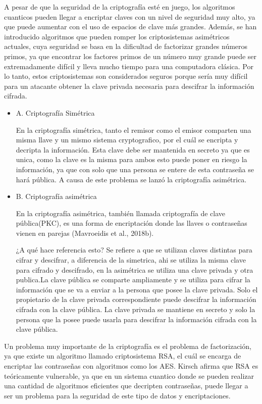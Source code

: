 \documentclass{article}
\begin{document}
A pesar de que la seguridad de la criptografía esté en juego, los algoritmos cuanticos pueden llegar a encriptar claves con un nivel de seguridad muy alto, ya que puede aumentar con el uso de espacios de clave más grandes. Además, se han introducido algoritmos que pueden romper los criptosistemas asimétricos actuales, cuya seguridad se basa en la dificultad de factorizar grandes números primos, ya que encontrar los factores primos de un número muy grande puede ser extremadamente difícil y lleva mucho tiempo para una computadora clásica. Por lo tanto, estos criptosistemas son considerados seguros porque sería muy difícil para un atacante obtener la clave privada necesaria para descifrar la información cifrada.

\begin{itemize}
    \item{A}. Criptografía Simétrica

        En la criptografía simétrica, tanto el remisor como el emisor comparten una misma llave y un mismo sistema cryptografico, por el cuál se encripta y decripta la información. Esta clave debe ser mantenida en secreto ya que es unica, como la clave es la misma para ambos esto puede poner en riesgo la información, ya que con solo que una persona se entere de esta contraseña se hará pública. A causa de este problema se lanzó la criptografía asimétrica.
    \item{B}. Criptografía asimétrica

        En la criptografía asimétrica, también llamada criptografía de clave pública(PKC), es una forma de encriptación donde las llaves o contraseñas vienen en parejas (Mavroeidis et al., 2018b).

        ¿A qué hace referencia esto? Se refiere a que se utilizan claves distintas para cifrar y descifrar, a diferencia de la simetrica, ahi se utiliza la misma clave para cifrado y descifrado, en la asimétrica se utiliza una clave privada y otra publica.La clave pública se comparte ampliamente y se utiliza para cifrar la información que se va a enviar a la persona que posee la clave privada. Solo el propietario de la clave privada correspondiente puede descifrar la información cifrada con la clave pública. La clave privada se mantiene en secreto y solo la persona que la posee puede usarla para descifrar la información cifrada con la clave pública.

\end{itemize}

Un problema muy importante de la criptografía es el problema de factorización, ya que existe un algoritmo llamado criptosistema RSA, el cuál se encarga de encriptar las contraseñas con algoritmos como los AES. Kirsch afirma que RSA es teóricamente vulnerable, ya que en un sistema cuantico donde se pueden realizar una cantidad de algoritmos eficientes que decripten contraseñas, puede llegar a ser un problema para la seguridad de este tipo de datos y encriptaciones.
\end{document}

